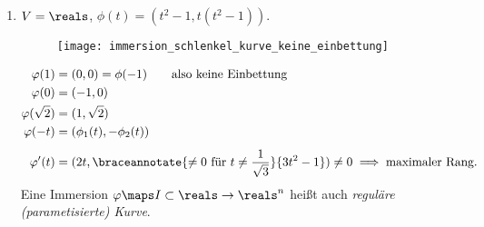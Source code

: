 \begin{beispiele*}
  \begin{enumerate}[label=\rechtsklammer{\roman*}]
    \item \label{immersion_beispiel:schlenkel_kurve} \( V=\reals \), \( \phi(t)=(t^2-1,t(t^2-1)) \). 
    \begin{figure}[H]
      \centering
      \texttt{[image: immersion\_schlenkel\_kurve\_keine\_einbettung]}
      \label{fig:immersion_schlenkel_kurve_keine_einbettung}
    \end{figure}
    \begin{align*}
      \varphi(1)&=(0,0)=\phi(-1)\qquad \text{also keine Einbettung}\\
      \varphi(0)&=(-1,0)\\
      \varphi(\sqrt{2})&=(1,\sqrt{2})\\
      \varphi(-t)&=(\phi_1(t),-\phi_2(t))\\[1ex]
      \varphi'(t)&=(2t,\braceannotate{\neq 0 \text{ für }t\neq \frac{1}{\sqrt{3}}}{3t^2-1})\neq 0\implies \text{maximaler Rang}.
    \end{align*}
    Eine Immersion \( \varphi\maps I\subset \reals\to \reals^n \) heißt auch \emph{reguläre (parametisierte) Kurve}.
    

\end{enumerate}
\end{beispiele*}
